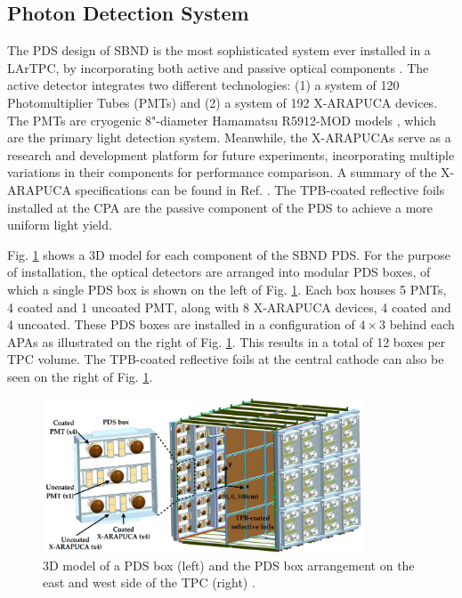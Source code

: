 \subsection{Photon Detection System}
\label{sec:sbnd_pds}

The PDS design of SBND is the most sophisticated system ever installed in a LArTPC, by incorporating both active and passive optical components \cite{sbnd_pds_paper}. 
The active detector integrates two different technologies: (1) a system of 120 Photomultiplier Tubes (PMTs) and (2) a system of 192 X-ARAPUCA devices.
The PMTs are cryogenic 8"-diameter Hamamatsu R5912-MOD models \cite{hamamatsu}, which are the primary light detection system. 
Meanwhile, the X-ARAPUCAs serve as a research and development platform for future experiments, incorporating multiple variations in their components for performance comparison. 
A summary of the X-ARAPUCA specifications can be found in Ref. \cite{sbnd_pds_paper}.
The TPB-coated reflective foils installed at the CPA are the passive component of the PDS to achieve a more uniform light yield.

Fig. \ref{fig:SBND_PDS} shows a 3D model for each component of the SBND PDS.
For the purpose of installation, the optical detectors are arranged into modular PDS boxes, of which a single PDS box is shown on the left of Fig. \ref{fig:SBND_PDS}.
Each box houses 5 PMTs, 4 coated and 1 uncoated PMT, along with 8 X-ARAPUCA devices, 4 coated and 4 uncoated.
These PDS boxes are installed in a configuration of $4 \times 3$ behind each APAs as illustrated on the right of Fig. \ref{fig:SBND_PDS}.
This results in a total of 12 boxes per TPC volume.
The TPB-coated reflective foils at the central cathode can also be seen on the right of Fig. \ref{fig:SBND_PDS}.

\begin{figure}[hbp]
\centering    
\includegraphics[width=0.85\textwidth]{SBND_PDS}
\caption[Photon Detection System 3D Model]{
3D model of a PDS box (left) and the PDS box arrangement on the east and west side of the TPC (right) \cite{sbnd_pds_paper}.
}
\label{fig:SBND_PDS}
\end{figure}

